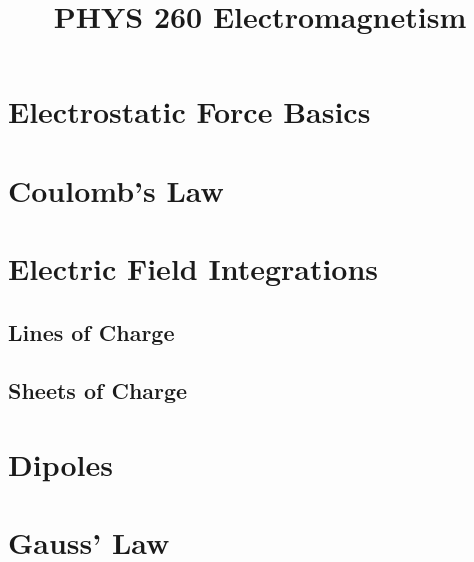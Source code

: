 \documentclass[10pt, twocolumn]{article}
\title{PHYS 260 Electromagnetism}
\author{\authorstyle{Miles Kent}}
\date{}
\begin{document}
\maketitle

    \section{Electrostatic Force Basics}    

    \section{Coulomb's Law}    

    \section{Electric Field Integrations}    

        \subsection{Lines of Charge}    
        \subsection{Sheets of Charge}    

    \section{Dipoles}    

    \section{Gauss' Law}
\end{document}
